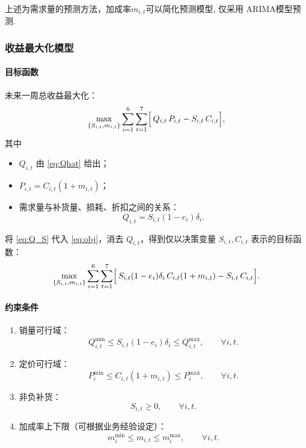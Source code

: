 \documentclass{cumcmthesis}
\begin{document}
上述为需求量的预测方法，加成率$m_{i,t}$可以简化预测模型, 仅采用
ARIMA模型预测. 

\subsubsection{收益最大化模型}
\paragraph{目标函数}

未来一周总收益最大化：
\begin{equation}
\max_{\{S_{i,t},m_{i,t}\}}
\sum_{i=1}^6\sum_{t=1}^7
\Bigl[\,Q_{i,t}\,P_{i,t}-S_{i,t}\,C_{i,t}\Bigr],
\label{eq:obj}
\end{equation}
其中
\begin{itemize}
\item $Q_{i,t}$ 由 \eqref{eq:Qhat} 给出；
\item $P_{i,t}=C_{i,t}(1+m_{i,t})$；
\item 需求量与补货量、损耗、折扣之间的关系：
      \begin{equation}
      Q_{i,t} = S_{i,t}(1-e_i)\delta_i.
      \label{eq:Q_S}
      \end{equation}
\end{itemize}

将 \eqref{eq:Q_S} 代入 \eqref{eq:obj}，消去 $Q_{i,t}$，得到仅以决策变量 $S_{i,t},C_{i,t}$ 表示的目标函数：
\begin{equation}
\max_{\{S_{i,t},m_{i,t}\}}
\sum_{i=1}^6\sum_{t=1}^7
\Bigl[\,S_{i,t}(1-e_i)\delta_i\,C_{i,t}(1+m_{i,t})-S_{i,t}\,C_{i,t}\Bigr].
\label{eq:obj_simp}
\end{equation}


\paragraph{约束条件}

\begin{enumerate}
\item 销量可行域：
      \[
      Q_{i,t}^{\min} \le S_{i,t}(1-e_i)\delta_i \le Q_{i,t}^{\max},
      \qquad \forall i,t.
      \]
\item 定价可行域：
      \[
      P_{i}^{\min} \le C_{i,t}(1+m_{i,t}) \le P_{i}^{\max},
      \qquad \forall i,t.
      \]
\item 非负补货：
      \[
      S_{i,t} \ge 0,\qquad \forall i,t.
      \]
\item 加成率上下限（可根据业务经验设定）：
      \[
      m_{i}^{\min} \le m_{i,t} \le m_{i}^{\max},
      \qquad \forall i,t.
      \]
\end{enumerate}
\end{document}
